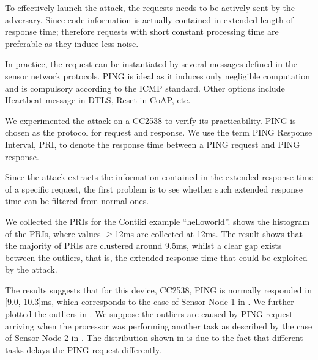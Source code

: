 To effectively launch the attack, the requests needs to be actively sent by the adversary. Since code information is actually contained in extended  length of response time; therefore requests with short constant processing time are preferable as they induce less noise. 

In practice, the request can be instantiated by several messages defined in the sensor network protocols. PING is ideal as it induces only negligible computation and is compulsory according to the ICMP standard\cite{rfc4433}. Other options include Heartbeat message in DTLS\cite{rfc6520}, Reset in CoAP\cite{rfc7252}, etc.

We experimented the attack on a CC2538 to verify its practicability. PING is chosen as the protocol for request and response. We use the term PING Response Interval, PRI, to denote the response time between a PING request and PING response.

Since the attack extracts the information contained in the extended response time of a specific request, the first problem is to see whether such extended response time can be filtered from normal ones. 

We collected the PRIs for the  Contiki example ``helloworld''.  shows the histogram of the PRIs, where values $\geq$12ms are collected at 12ms. The result shows that the majority of PRIs are clustered around 9.5ms, whilst a clear gap exists between the outliers, that is, the extended response time that could be exploited by the attack. 

The results suggests that for this device, CC2538, PING is normally responded in [9.0, 10.3]ms, which corresponds to the case of Sensor Node 1 in . We further plotted the outliers in . We suppose the outliers are caused by PING request arriving when the processor was performing another task as described by the case of Sensor Node 2 in . The distribution shown in  is due to the fact that different tasks delays the PING request differently.

